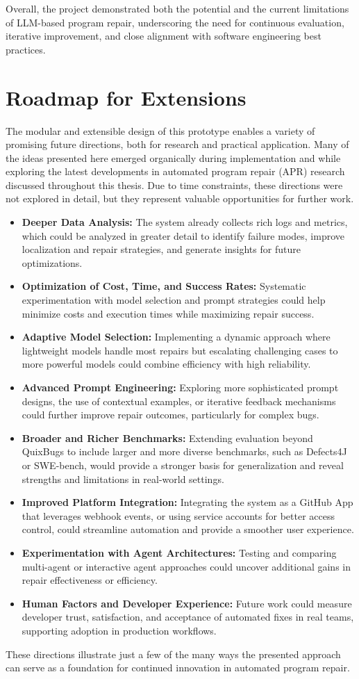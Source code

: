 Overall, the project demonstrated both the potential and the current limitations of LLM-based program repair, underscoring the need for continuous evaluation, iterative improvement, and close alignment with software engineering best practices.


\section{Roadmap for Extensions} \label{section:roadmap}
The modular and extensible design of this prototype enables a variety of promising future directions, both for research and practical application. Many of the ideas presented here emerged organically during implementation and while exploring the latest developments in automated program repair (APR) research discussed throughout this thesis. Due to time constraints, these directions were not explored in detail, but they represent valuable opportunities for further work.

\begin{itemize}
    \item \textbf{Deeper Data Analysis:} The system already collects rich logs and metrics, which could be analyzed in greater detail to identify failure modes, improve localization and repair strategies, and generate insights for future optimizations.
    \item \textbf{Optimization of Cost, Time, and Success Rates:} Systematic experimentation with model selection and prompt strategies could help minimize costs and execution times while maximizing repair success.
    \item \textbf{Adaptive Model Selection:} Implementing a dynamic approach where lightweight models handle most repairs but escalating challenging cases to more powerful models could combine efficiency with high reliability.
    \item \textbf{Advanced Prompt Engineering:} Exploring more sophisticated prompt designs, the use of contextual examples, or iterative feedback mechanisms could further improve repair outcomes, particularly for complex bugs.
    \item \textbf{Broader and Richer Benchmarks:} Extending evaluation beyond QuixBugs to include larger and more diverse benchmarks, such as Defects4J or SWE-bench, would provide a stronger basis for generalization and reveal strengths and limitations in real-world settings.
    \item \textbf{Improved Platform Integration:} Integrating the system as a GitHub App that leverages webhook events, or using service accounts for better access control, could streamline automation and provide a smoother user experience.
    \item \textbf{Experimentation with Agent Architectures:} Testing and comparing multi-agent or interactive agent approaches could uncover additional gains in repair effectiveness or efficiency.
    \item \textbf{Human Factors and Developer Experience:} Future work could measure developer trust, satisfaction, and acceptance of automated fixes in real teams, supporting adoption in production workflows.
\end{itemize}

These directions illustrate just a few of the many ways the presented approach can serve as a foundation for continued innovation in automated program repair.
